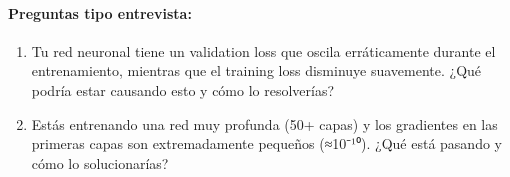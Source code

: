 \documentclass[a4,11pt]{aleph-notas}
\begin{document}
\paragraph{Preguntas tipo entrevista:}
\begin{enumerate}[leftmargin=*]
    \item Tu red neuronal tiene un validation loss que oscila erráticamente durante el entrenamiento, mientras que el training loss disminuye suavemente. ¿Qué podría estar causando esto y cómo lo resolverías?
    
    \item Estás entrenando una red muy profunda (50+ capas) y los gradientes en las primeras capas son extremadamente pequeños (≈10⁻¹⁰). ¿Qué está pasando y cómo lo solucionarías?
\end{enumerate}
\end{document}
